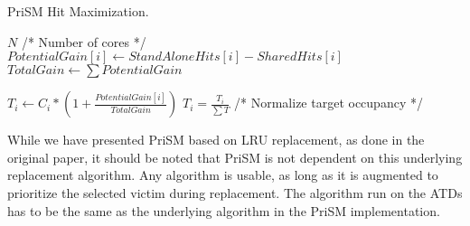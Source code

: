 \begin{algorithm}[ht]
\caption{PriSM Hit Maximization.}
\label{alg:algorithms:prism}
\begin{algorithmic}[1]
\State $N$ /* Number of cores */
    \State $PotentialGain[i]\gets StandAloneHits[i] - SharedHits[i]$
\EndFor
\State $TotalGain\gets \sum{PotentialGain}$

    \State $T_i\gets C_i * (1 + \frac{PotentialGain[i]}{TotalGain})$
\EndFor
\State $T_i = \frac{T_i}{\sum{T}}$ /* Normalize target occupancy */
\end{algorithmic}
\end{algorithm}

While we have presented PriSM based on LRU replacement, as done in the original paper, it should be noted that PriSM is not dependent on this underlying replacement algorithm.
Any algorithm is usable, as long as it is augmented to prioritize the selected victim during replacement.
The algorithm run on the ATDs has to be the same as the underlying algorithm in the PriSM implementation.
